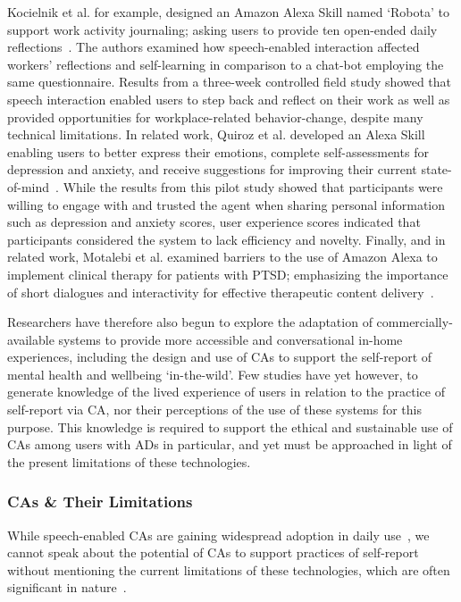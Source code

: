         Kocielnik et al. for example, designed an Amazon Alexa Skill named `Robota' to support work activity journaling; asking users to provide ten open-ended daily reflections~\cite{Rafal2018Workplace}. The authors examined how speech-enabled interaction affected workers' reflections and self-learning in comparison to a chat-bot employing the same questionnaire. Results from a three-week controlled field study showed that speech interaction enabled users to step back and reflect on their work as well as provided opportunities for workplace-related behavior-change, despite many technical limitations. In related work, Quiroz et al. developed an Alexa Skill enabling users to better express their emotions, complete self-assessments for depression and anxiety, and receive suggestions for improving their current state-of-mind~\cite{quiroz2020alexa}. While the results from this pilot study showed that participants were willing to engage with and trusted the agent when sharing personal information such as depression and anxiety scores, user experience scores indicated that participants considered the system to lack efficiency and novelty. Finally, and in related work, Motalebi et al. examined barriers to the use of Amazon Alexa to implement clinical therapy for patients with \ac{PTSD}; emphasizing the importance of short dialogues and interactivity for effective therapeutic content delivery~\cite{motalebi2018ptsd}.
        
        Researchers have therefore also begun to explore the adaptation of commercially-available systems to provide more accessible and conversational in-home experiences, including the design and use of \ac{CA}s to support the self-report of mental health and wellbeing `in-the-wild'. Few studies have yet however, to generate knowledge of the lived experience of users in relation to the practice of self-report via \ac{CA}, nor their perceptions of the use of these systems for this purpose. This knowledge is required to support the ethical and sustainable use of \ac{CA}s among users with \acp{AD} in particular, and yet must be approached in light of the present limitations of these technologies.
        
        \subsubsection{\ac{CA}s \& Their Limitations}\label{sec:ca_limitations}
    
            While speech-enabled \ac{CA}s are gaining widespread adoption in daily use~\cite{edisonresearch2020,Voicebot2019,chung2018health}, we cannot speak about the potential of \ac{CA}s to support practices of self-report without mentioning the current limitations of these technologies, which are often significant in nature~\cite{shneiderman2000limits, suhm2003towards, moore2013spoken, Gulfbetwee2016ewa, onceakind2019minji}.

